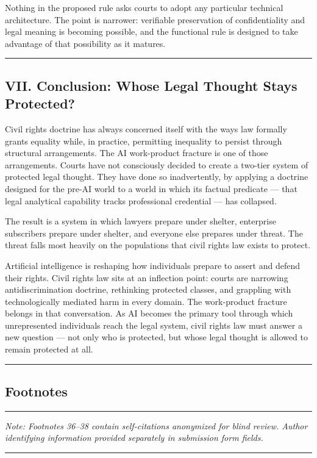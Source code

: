\documentclass[
  12pt,
]{article}
\begin{document}
Nothing in the proposed rule asks courts to adopt any particular
technical architecture. The point is narrower: verifiable preservation
of confidentiality and legal meaning is becoming possible, and the
functional rule is designed to take advantage of that possibility as it
matures.

\begin{center}\rule{0.5\linewidth}{0.5pt}\end{center}

\subsection{VII. Conclusion: Whose Legal Thought Stays
Protected?}\label{vii-conclusion-whose-legal-thought-stays-protected}

Civil rights doctrine has always concerned itself with the ways law
formally grants equality while, in practice, permitting inequality to
persist through structural arrangements. The AI work-product fracture is
one of those arrangements. Courts have not consciously decided to create
a two-tier system of protected legal thought. They have done so
inadvertently, by applying a doctrine designed for the pre-AI world to a
world in which its factual predicate --- that legal analytical
capability tracks professional credential --- has collapsed.

The result is a system in which lawyers prepare under shelter,
enterprise subscribers prepare under shelter, and everyone else prepares
under threat. The threat falls most heavily on the populations that
civil rights law exists to protect.

Artificial intelligence is reshaping how individuals prepare to assert
and defend their rights. Civil rights law sits at an inflection point:
courts are narrowing antidiscrimination doctrine, rethinking protected
classes, and grappling with technologically mediated harm in every
domain. The work-product fracture belongs in that conversation. As AI
becomes the primary tool through which unrepresented individuals reach
the legal system, civil rights law must answer a new question --- not
only who is protected, but whose legal thought is allowed to remain
protected at all.

\begin{center}\rule{0.5\linewidth}{0.5pt}\end{center}

\subsection{Footnotes}\label{footnotes}

\begin{center}\rule{0.5\linewidth}{0.5pt}\end{center}

\emph{Note: Footnotes 36--38 contain self-citations anonymized for blind
review. Author identifying information provided separately in submission
form fields.}

\begin{center}\rule{0.5\linewidth}{0.5pt}\end{center}
\end{document}
